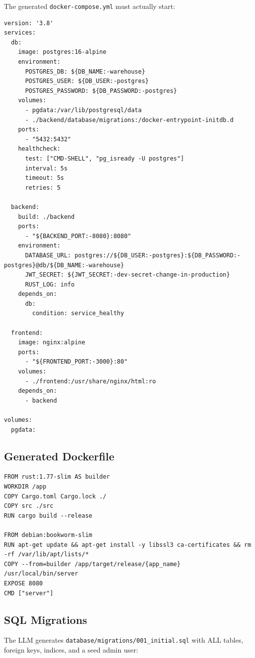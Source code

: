 \documentclass[11pt,a4paper]{article}
\begin{document}
The generated \texttt{docker-compose.yml} must actually start:

\begin{lstlisting}[title=Generated docker-compose.yml]
version: '3.8'
services:
  db:
    image: postgres:16-alpine
    environment:
      POSTGRES_DB: ${DB_NAME:-warehouse}
      POSTGRES_USER: ${DB_USER:-postgres}
      POSTGRES_PASSWORD: ${DB_PASSWORD:-postgres}
    volumes:
      - pgdata:/var/lib/postgresql/data
      - ./backend/database/migrations:/docker-entrypoint-initdb.d
    ports:
      - "5432:5432"
    healthcheck:
      test: ["CMD-SHELL", "pg_isready -U postgres"]
      interval: 5s
      timeout: 5s
      retries: 5

  backend:
    build: ./backend
    ports:
      - "${BACKEND_PORT:-8080}:8080"
    environment:
      DATABASE_URL: postgres://${DB_USER:-postgres}:${DB_PASSWORD:-postgres}@db/${DB_NAME:-warehouse}
      JWT_SECRET: ${JWT_SECRET:-dev-secret-change-in-production}
      RUST_LOG: info
    depends_on:
      db:
        condition: service_healthy

  frontend:
    image: nginx:alpine
    ports:
      - "${FRONTEND_PORT:-3000}:80"
    volumes:
      - ./frontend:/usr/share/nginx/html:ro
    depends_on:
      - backend

volumes:
  pgdata:
\end{lstlisting}

\subsection{Generated Dockerfile}

\begin{lstlisting}[title=Generated backend/Dockerfile]
FROM rust:1.77-slim AS builder
WORKDIR /app
COPY Cargo.toml Cargo.lock ./
COPY src ./src
RUN cargo build --release

FROM debian:bookworm-slim
RUN apt-get update && apt-get install -y libssl3 ca-certificates && rm -rf /var/lib/apt/lists/*
COPY --from=builder /app/target/release/{app_name} /usr/local/bin/server
EXPOSE 8080
CMD ["server"]
\end{lstlisting}

\subsection{SQL Migrations}

The LLM generates \texttt{database/migrations/001\_initial.sql}
with ALL tables, foreign keys, indices, and a seed admin user:
\end{document}
